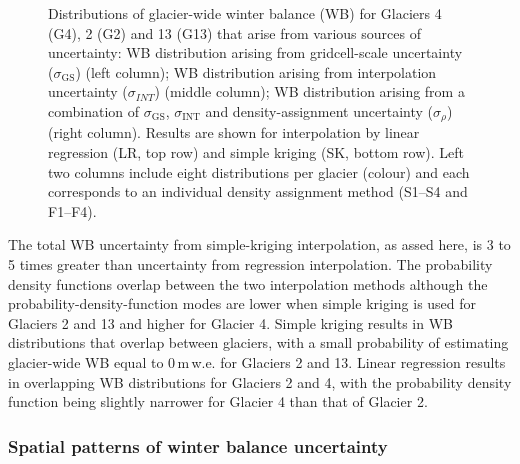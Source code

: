 \documentclass{sfuthesis}
\begin{document}
{\begin{figure}[H]
	\centering
	\caption[Distributions of glacier-wide winter balance (WB) for study glaciers that arise from various sources of uncertainty]{Distributions of glacier-wide winter balance (WB) for Glaciers 4 (G4), 2 (G2) and 13 (G13) that arise from various sources of uncertainty: WB distribution arising from gridcell-scale uncertainty ($\sigma_{\mathrm{GS}}$) (left column); WB distribution arising from interpolation uncertainty ($\sigma_{INT}$) (middle column); WB distribution arising from a combination of $\sigma_{\mathrm{GS}}$, $\sigma_{\mathrm{INT}}$ and density-assignment uncertainty ($\sigma_{\rho}$) (right column). Results are shown for interpolation by linear regression (LR, top row) and simple kriging (SK, bottom row). Left two columns include eight distributions per glacier (colour) and each corresponds to an individual density assignment method (S1--S4 and F1--F4).}
	\label{fig:WSMBDist_LR}
\end{figure}

The total WB uncertainty from simple-kriging interpolation, as assed here, is 3 to 5 times greater than uncertainty from regression interpolation. The probability density functions overlap between the two interpolation methods although the probability-density-function modes are lower when simple kriging is used for Glaciers 2 and 13 and higher for Glacier 4. Simple kriging results in WB distributions that overlap between glaciers, with a small probability of estimating glacier-wide WB equal to 0\,m\,w.e. for Glaciers 2 and 13. Linear regression results in overlapping WB distributions for Glaciers 2 and 4, with the probability density function being slightly narrower for Glacier 4 than that of Glacier 2. 

\subsubsection{Spatial patterns of winter balance uncertainty}

}
\end{document}
